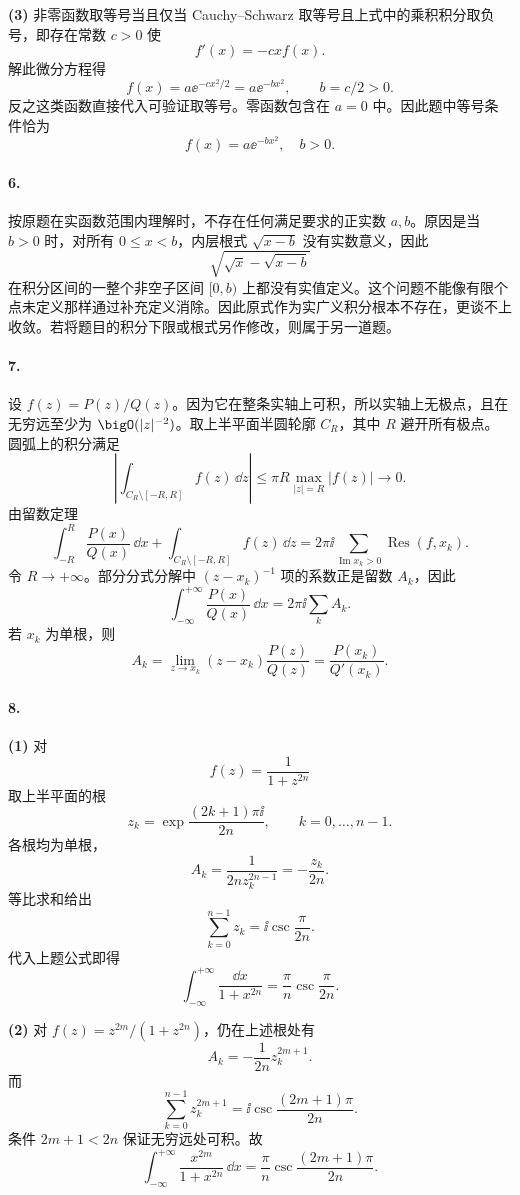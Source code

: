 \textbf{(3)} 非零函数取等号当且仅当 Cauchy--Schwarz 取等号且上式中的乘积积分取负号，即存在常数 $c>0$ 使
\[
  f'(x)=-cxf(x).
\]
解此微分方程得
\[
  f(x)=a\ee^{-cx^2/2}=a\ee^{-bx^2},\qquad b=c/2>0.
\]
反之这类函数直接代入可验证取等号。零函数包含在 $a=0$ 中。因此题中等号条件恰为
\[
  \boxed{f(x)=a\ee^{-bx^2},\quad b>0}.
\]

\paragraph{6.}
按原题在实函数范围内理解时，不存在任何满足要求的正实数 $a,b$。原因是当 $b>0$ 时，对所有 $0\leq x<b$，内层根式 $\sqrt{x-b}$ 没有实数意义，因此
\[
  \sqrt{\sqrt{x}-\sqrt{x-b}}
\]
在积分区间的一整个非空子区间 $[0,b)$ 上都没有实值定义。这个问题不能像有限个点未定义那样通过补充定义消除。因此原式作为实广义积分根本不存在，更谈不上收敛。若将题目的积分下限或根式另作修改，则属于另一道题。

\paragraph{7.}
设 $f(z)=P(z)/Q(z)$。因为它在整条实轴上可积，所以实轴上无极点，且在无穷远至少为 $\bigO(|z|^{-2})$。取上半平面半圆轮廓 $C_R$，其中 $R$ 避开所有极点。圆弧上的积分满足
\[
  \left|\int_{C_R\setminus[-R,R]}f(z)\,\dd z\right|
  \leq \pi R\max_{|z|=R}|f(z)|\to0.
\]
由留数定理
\[
  \int_{-R}^{R}\frac{P(x)}{Q(x)}\,\dd x
  +\int_{C_R\setminus[-R,R]}f(z)\,\dd z
  =2\pi\ii\sum_{\operatorname{Im}x_k>0}\operatorname{Res}(f,x_k).
\]
令 $R\to+\infty$。部分分式分解中 $(z-x_k)^{-1}$ 项的系数正是留数 $A_k$，因此
\[
  \boxed{\int_{-\infty}^{+\infty}\frac{P(x)}{Q(x)}\,\dd x
  =2\pi\ii\sum_kA_k}.
\]
若 $x_k$ 为单根，则
\[
  A_k=\lim_{z\to x_k}(z-x_k)\frac{P(z)}{Q(z)}
  =\boxed{\frac{P(x_k)}{Q'(x_k)}}.
\]

\paragraph{8.}
\textbf{(1)} 对
\[
  f(z)=\frac1{1+z^{2n}}
\]
取上半平面的根
\[
  z_k=\exp\frac{(2k+1)\pi\ii}{2n},\qquad k=0,\ldots,n-1.
\]
各根均为单根，
\[
  A_k=\frac1{2n z_k^{2n-1}}=-\frac{z_k}{2n}.
\]
等比求和给出
\[
  \sum_{k=0}^{n-1}z_k=\ii\operatorname{csc}\frac\pi{2n}.
\]
代入上题公式即得
\[
  \boxed{\int_{-\infty}^{+\infty}\frac{\dd x}{1+x^{2n}}
  =\frac\pi n\operatorname{csc}\frac\pi{2n}}.
\]

\textbf{(2)} 对 $f(z)=z^{2m}/(1+z^{2n})$，仍在上述根处有
\[
  A_k=-\frac1{2n}z_k^{2m+1}.
\]
而
\[
  \sum_{k=0}^{n-1}z_k^{2m+1}
  =\ii\operatorname{csc}\frac{(2m+1)\pi}{2n}.
\]
条件 $2m+1<2n$ 保证无穷远处可积。故
\[
  \boxed{\int_{-\infty}^{+\infty}\frac{x^{2m}}{1+x^{2n}}\,\dd x
  =\frac\pi n\operatorname{csc}\frac{(2m+1)\pi}{2n}}.
\]


